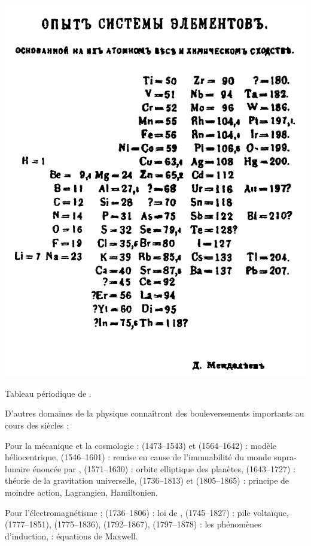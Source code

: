\marginpar
{
	\vspace{2cm}
	\includegraphics[width=\marginparwidth]{SM/periodique.png}
    \captionsetup{type=figure}\caption{Tableau périodique de .}
    \label{periodique}
}
D'autres domaines de la physique connaîtront des bouleversements importants au cours des siècles : 

Pour la mécanique et la cosmologie :  (\num{1473}--\num{1543}) et  (\num{1564}--\num{1642}) : modèle héliocentrique,  (\num{1546}--\num{1601}) : remise en cause de  l'immuabilité du monde supra-lunaire énoncée par ,  (\num{1571}--\num{1630}) : orbite elliptique des planètes,  (\num{1643}--\num{1727}) : théorie de la gravitation universelle,  \hbox{(\num{1736}--\num{1813})} et  (\num{1805}--\num{1865}) : principe de moindre action, Lagrangien, Hamiltonien.

Pour l'électromagnétisme :  (\num{1736}--\num{1806}) : loi de ,  (\num{1745}--\num{1827}) : pile voltaïque,  (\num{1777}--\num{1851}),  (\num{1775}--\num{1836}),  (\num{1792}--\num{1867}),  (\num{1797}--\num{1878}) : les phénomènes d'induction,  : équations de Maxwell.

